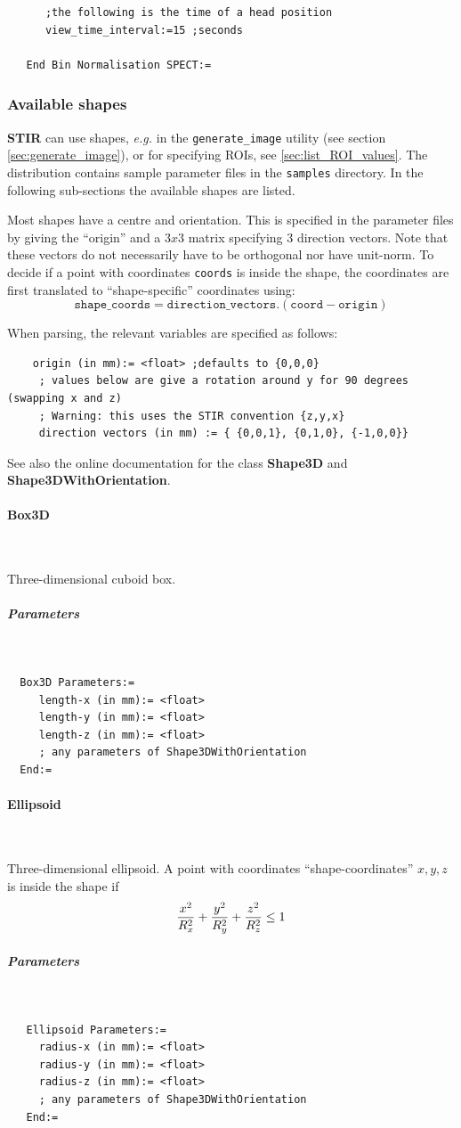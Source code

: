 \documentclass{article}
\newcommand{\subsubsubsection}[1]{\paragraph{#1}\mbox{} \\}
\newcommand{\subsubsubsubsection}[1]{\subparagraph{#1} \mbox{} \\}
\begin{document}
{{{{{{\begin{verbatim}
      ;the following is the time of a head position
      view_time_interval:=15 ;seconds

   End Bin Normalisation SPECT:=
\end{verbatim}


\subsubsection{
Available shapes}
\label{sec:shapes}
\textbf{STIR} can use shapes, \textit{e.g.} in the \texttt{generate\_image}
utility (see section \ref{sec:generate_image}), or for specifying ROIs, see \ref{sec:list_ROI_values}.
The distribution contains sample parameter files in the
\texttt{samples} directory. In the following sub-sections the available shapes are listed.

Most shapes have a centre and orientation. This is specified in the parameter files
by giving the ``origin'' and a $3x3$ matrix specifying $3$ direction vectors.
Note that these vectors do not necessarily have to be orthogonal nor have unit-norm.
To decide if a point with coordinates \texttt{coords} is inside the shape, the
coordinates are first translated to ``shape-specific'' coordinates using:
\[
\mathtt{shape\_coords} = \mathtt{direction\_vectors}. (\mathtt{coord}-\mathtt{origin})
\]

When parsing, the relevant variables are specified as follows:
\begin{verbatim}
    origin (in mm):= <float> ;defaults to {0,0,0}
     ; values below are give a rotation around y for 90 degrees (swapping x and z)
     ; Warning: this uses the STIR convention {z,y,x}
     direction vectors (in mm) := { {0,0,1}, {0,1,0}, {-1,0,0}}
\end{verbatim}

See also the online documentation for the class \textbf{Shape3D} and
\textbf{Shape3DWithOrientation}.

{ \subsubsubsection{Box3D}
}
Three-dimensional cuboid box.
{ \subsubsubsubsection{Parameters}
}
\begin{verbatim}
  Box3D Parameters:=
     length-x (in mm):= <float>
     length-y (in mm):= <float>
     length-z (in mm):= <float>
     ; any parameters of Shape3DWithOrientation
  End:=
\end{verbatim}

{ \subsubsubsection{Ellipsoid}
}
Three-dimensional ellipsoid.
A point with coordinates ``shape-coordinates'' $x,y,z$ is inside the shape if
\[
  {x^2 \over R_x^2} + {y^2 \over R_y^2} + {z^2 \over R_z^2} \le 1
\]
{ \subsubsubsubsection{Parameters}
}
\begin{verbatim}
   Ellipsoid Parameters:=
     radius-x (in mm):= <float>
     radius-y (in mm):= <float>
     radius-z (in mm):= <float>
     ; any parameters of Shape3DWithOrientation
   End:=
\end{verbatim}

}}}}}}
\end{document}
